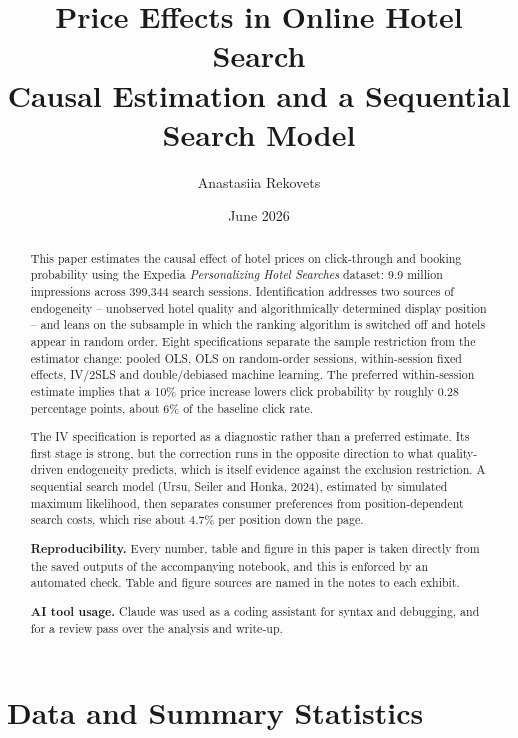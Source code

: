 \documentclass[11pt]{article}
\title{\vspace{-2em}\textbf{Price Effects in Online Hotel Search}\\[0.4em]
       \large Causal Estimation and a Sequential Search Model}
\author{Anastasiia Rekovets}
\date{June 2026}
\begin{document}
\maketitle
\thispagestyle{empty}

\begin{abstract}
\noindent
This paper estimates the causal effect of hotel prices on click-through and
booking probability using the Expedia \emph{Personalizing Hotel Searches}
dataset: 9.9 million impressions across 399,344 search sessions. Identification
addresses two sources of endogeneity -- unobserved hotel quality and
algorithmically determined display position -- and leans on the subsample in
which the ranking algorithm is switched off and hotels appear in random order.
Eight specifications separate the sample restriction from the estimator change:
pooled OLS, OLS on random-order sessions, within-session fixed effects, IV/2SLS
and double/debiased machine learning. The preferred within-session estimate
implies that a 10\% price increase lowers click probability by roughly 0.28
percentage points, about 6\% of the baseline click rate.

\vspace{0.5em}
\noindent
The IV specification is reported as a diagnostic rather than a preferred
estimate. Its first stage is strong, but the correction runs in the opposite
direction to what quality-driven endogeneity predicts, which is itself evidence
against the exclusion restriction. A sequential search model
(Ursu, Seiler and Honka, 2024), estimated by simulated maximum likelihood,
then separates consumer preferences from position-dependent search costs, which
rise about 4.7\% per position down the page.

\vspace{1em}
\noindent\textbf{Reproducibility.} Every number, table and figure in this paper
is taken directly from the saved outputs of the accompanying notebook, and this
is enforced by an automated check. Table and figure sources are named in the
notes to each exhibit.

\vspace{0.5em}
\noindent\textbf{AI tool usage.} Claude was used as a coding assistant for
syntax and debugging, and for a review pass over the analysis and write-up.
\end{abstract}

\clearpage
\tableofcontents
\clearpage


\section{Data and Summary Statistics}
\end{document}
